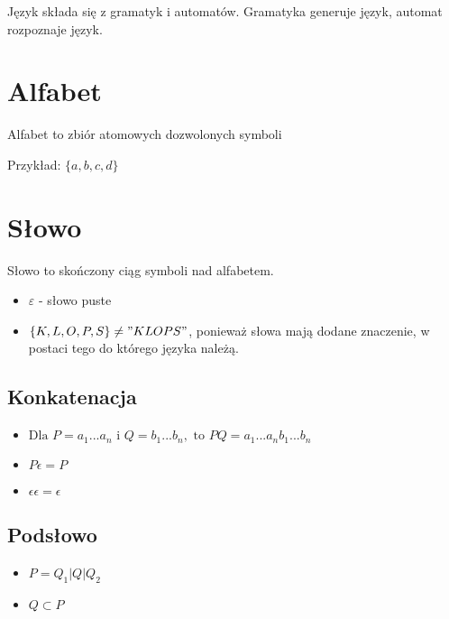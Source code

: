 \documentclass{../notatki}
\begin{document}
Język składa się z gramatyk i automatów. Gramatyka generuje język, automat rozpoznaje język.


\section{Alfabet}

Alfabet to zbiór atomowych dozwolonych symboli

Przykład: $\{a, b, c, d\}$

\section{Słowo}

Słowo to skończony ciąg symboli nad alfabetem.

\begin{itemize}
    \item $\varepsilon$ - słowo puste
    \item $\{K, L, O, P, S\} \ne "KLOPS"$, ponieważ słowa mają dodane znaczenie, w postaci tego do którego języka należą.
\end{itemize}

\subsection{Konkatenacja}

\begin{itemize}
    \item $\text{Dla } P=a_1...a_n \text{ i } Q=b_1...b_n, \text{ to } PQ=a_1...a_nb_1...b_n$
    \item $P\epsilon = P$
    \item $\epsilon\epsilon = \epsilon$
\end{itemize}

\subsection{Podsłowo}

\begin{itemize}
    \item $P = Q_1 | Q | Q_2$
    \item $Q \subset P$
\end{itemize}
\end{document}
